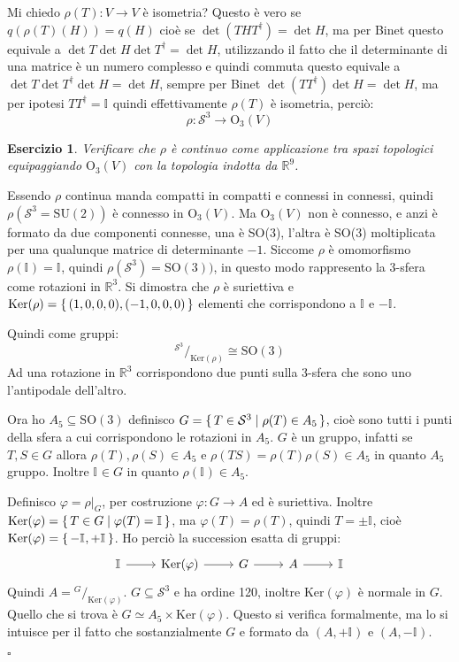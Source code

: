 \documentclass[10pt, twoside=false, x11names]{scrbook}
\newcounter{exercises}
\newtheorem{exercise}[exercises]{Esercizio}
\newenvironment{proof}{{\textbf{Dimostrazione}:}}{\hfill $\square$}
\renewcommand{\ker}[1]{\mathrm{Ker}( #1)}
\newcommand{\RN}[1][]{\mathbb{R}^#1}
\newcommand{\Id}[1][]{\mathbb{I}_#1}
\newcommand{\Sph}[1][]{\mathcal{S}^#1}
\newcommand*\quot[2]{{^{\textstyle #1}\big/_{\textstyle #2}}}
\let\phi\varphi
\begin{document}
\begin{proof}
  Mi chiedo $ \rho(T) \colon V \to V $ è isometria? Questo è vero se $ q(\rho(T)(H)) = q(H) $
  cioè se $ \det(THT^\dagger) = \det{H} $, ma per Binet questo equivale a
  $ \det{T}\det{H}\det{T^\dagger} = \det{H} $, utilizzando il fatto che il determinante
  di una matrice è un numero complesso e quindi commuta questo equivale a
  $ \det{T}\det{T^\dagger}\det{H} = \det{H} $, sempre per Binet  $ \det(TT^\dagger)\det{H} = \det{H} $,
  ma per ipotesi $ TT^\dagger = \Id{} $ quindi effettivamente $ \rho(T) $ è isometria, perciò:
  \[
    \rho \colon \Sph{3} \to \mathrm{O}_3(V)
  \]
  \begin{exercise}
    Verificare che $ \rho $ è continuo come applicazione tra spazi topologici
    equipaggiando $ \mathrm{O}_3(V) $ con la topologia indotta da $ \RN{9} $.
  \end{exercise}
  Essendo $ \rho $ continua manda compatti in compatti e connessi in connessi, quindi
  $ \rho(\Sph{3}= \mathrm{SU(2)}) $ è connesso in $ \mathrm{O}_3(V) $.
  Ma $ \mathrm{O}_3(V) $ non è connesso, e anzi è formato da due componenti connesse,
  una è SO(3), l'altra è SO(3) moltiplicata per una qualunque matrice di determinante
  $ - 1 $. Siccome $ \rho $ è omomorfismo $ \rho(\Id{}) = \Id{} $, quindi $ \rho(\Sph{3}) =  \mathrm{SO(3)}) $,
  in questo modo rappresento la $ 3 $-sfera come rotazioni in $ \RN{3} $.
  Si dimostra che $ \rho $ è suriettiva e $ \ker{\rho} = \set{(1,0,0,0), (-1,0,0,0)} $ elementi
  che corrispondono a $ \Id{} $ e $ -\Id{} $.

  Quindi come gruppi:
  \[
    \quot{\Sph{3}}{\ker{\rho}} \cong \mathrm{SO(3)}
  \]
  Ad una rotazione in $ \RN{3} $ corrispondono due punti sulla $ 3 $-sfera che sono
  uno l'antipodale dell'altro.

  Ora ho $ A_5 \subseteq \mathrm{SO(3)} $ definisco $ G = \set{ T \in \Sph{3} | \rho(T) \in A_5} $,
  cioè sono tutti i punti della sfera a cui corrispondono le rotazioni in $ A_5 $.
  $ G $ è un gruppo, infatti se $ T, S \in G $ allora $ \rho(T), \rho(S) \in A_5 $ e
  $ \rho(TS) = \rho(T)\rho(S) \in A_5 $ in quanto $ A_5 $ gruppo. Inoltre $ \Id{} \in G $ in quanto
  $ \rho(\Id{}) \in A_5 $.

  Definisco $ \phi = \rho \big \lvert_G $, per costruzione $ \phi \colon G \to A $ ed è suriettiva.
  Inoltre $ \ker{\phi} = \set{ T \in G | \phi(T) = \Id{}} $, ma $ \phi(T) = \rho(T) $, quindi
  $ T = \pm \Id{} $, cioè $ \ker{\phi} = \set{- \Id{}, + \Id{}} $. Ho perciò la succession
  esatta di gruppi:
  \[
    \begin{tikzcd}
      \Id{} \arrow{r}{} & \ker{\phi} \arrow{r}{} & G \arrow{r}{} & A \arrow{r}{} & \Id{}
    \end{tikzcd}
  \]
  Quindi $ A = \quot{G}{\ker{\phi}} $.
  $ G \subseteq \Sph{3} $ e ha ordine 120, inoltre $ \ker{\phi} $ è normale in $ G $.
  Quello che si trova è $ G \simeq A_5 \times \ker{\phi} $. Questo si verifica formalmente, ma lo si
  intuisce per il fatto che sostanzialmente $ G $ e formato da $ (A, + \Id{}) $ e  $ (A, - \Id{}) $.


\end{proof}
\end{document}
